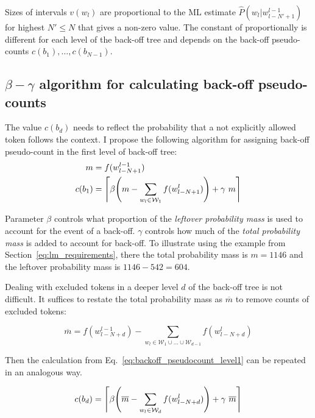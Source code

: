 \documentclass{IIBproject}
\DeclarePairedDelimiter{\ceil}{\lceil}{\rceil}
\DeclarePairedDelimiter{\bracket}{(}{)}
\begin{document}
Sizes of intervals $v(w_l)$ are proportional to the ML estimate $\hat P(w_l | w_{l-N'+1}^{l-1})$ for highest $N' \le N$ that gives a non-zero value. The constant of proportionally is different for each level of the back-off tree and depends on the back-off pseudo-counts $c(b_1), \dots, c(b_{N-1})$.

\subsection{$\beta-\gamma$ algorithm for calculating back-off pseudo-counts}

The value $c(b_d)$ needs to reflect the probability that a not explicitly allowed token follows the context. I propose the following algorithm for assigning back-off pseudo-count in the first level of back-off tree:
%
\begin{align}
\label{eq:total_probability_mass} m &= f(w_{l-N+1}^{l-1}) \\
\label{eq:backoff_pseudocount_level1} c(b_1) &= \ceil*{ \beta \bracket*{ m - \sum_{w_l \in \mathcal W_1} f(w_{l-N+1}^l) } + \gamma ~ m }
\end{align}

Parameter $\beta$ controls what proportion of the \emph{leftover probability mass} is used to account for the event of a back-off. $\gamma$ controls how much of the \emph{total probability mass} is added to account for back-off. To illustrate using the example from Section~\ref{eq:lm_requirements}, there the total probability mass is $m = 1146$ and the leftover probability mass is $1146-542=604$.

Dealing with excluded tokens in a deeper level $d$ of the back-off tree is not difficult. It suffices to restate the total probability mass as $\overline m$ to remove counts of excluded tokens:

\begin{equation}
\label{eq:adjusted_total_probability_mass}
\overline m = f(w_{l-N+d}^{l-1}) - \sum_{w_l \in \mathcal W_1 \cup \dots \cup \mathcal W_{d-1}} f(w_{l-N+d}^l)
\end{equation}

Then the calculation from Eq.~\ref{eq:backoff_pseudocount_level1} can be repeated in an analogous way.

\begin{equation}
\label{eq:backoff_pseudocount_deep_levels}
c(b_d) = \ceil*{ \beta \bracket*{ \overline m - \sum_{w_l \in \mathcal W_d} f(w_{l-N+d}^l) } + \gamma ~ \overline m }
\end{equation}
\end{document}
